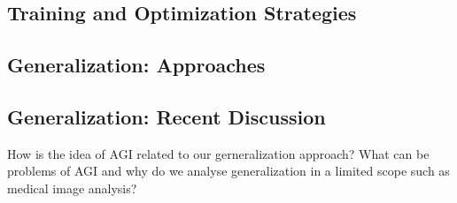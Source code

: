     \subsection{Training and Optimization Strategies} %
    \subsection{Generalization: Approaches} %

    \subsection{Generalization: Recent Discussion} %
        How is the idea of AGI related to our gerneralization approach? What can be problems of AGI and why do we analyse generalization in a limited scope such as medical image analysis?
